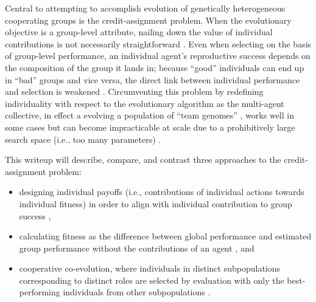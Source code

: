 Central to attempting to accomplish evolution of genetically heterogeneous cooperating groups is the credit-assignment problem.
When the evolutionary objective is a group-level attribute, nailing down the value of individual contributions is not necessarily straightforward \cite{panait2005cooperative}.
Even when selecting on the basis of group-level performance, an individual agent's reproductive success depends on the composition of the group it lands in; because ``good'' individuals can end up in ``bad'' groups and vice versa, the direct link between individual performance and selection is weakened \cite{waibel2009genetic}.
Circumventing this problem by redefining individuality with respect to the evolutionary algorithm as the multi-agent collective, in effect a evolving a population of ``team genomes'' \cite{waibel2009genetic}, works well in some cases \cite{miconi2003evolving,bongard2000legion} but can become impracticable at scale due to a prohibitively large search space (i.e., too many parameters) \cite{agogino2008efficient}.

This writeup will describe, compare, and contrast three approaches to the credit-assignment problem:
\begin{itemize}
  \item designing individual payoffs (i.e., contributions of individual actions towards individual fitness) in order to align with individual contribution to group success \cite{waibel2009genetic},
  \item calculating fitness as the difference between global performance and estimated group performance without the contributions of an agent \cite{knudson2010coevolution}, and
  \item cooperative co-evolution, where individuals in distinct subpopulations corresponding to distinct roles are selected by evaluation with only the best-performing individuals from other subpopulations \cite{gomes2015cooperative}.
\end{itemize}
